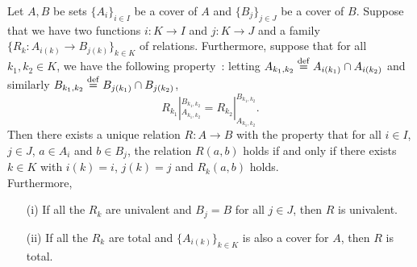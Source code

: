 \begin{proposition} \label{glueing-relations}
	Let $A,B$ be sets $\{A_i\}_{i \in I}$ be a cover of $A$ and $\{B_j\}_{j \in J}$ be a cover of $B$. Suppose that we have two functions $i : K \to I$ and $j : K \to J$ and a family $\{R_k : A_{i(k)} \to B_{j(k)}\}_{k \in K}$ of relations. Furthermore, suppose that for all $k_1,k_2 \in K$, we have the following property~: letting $A_{k_1,k_2} \overset{\mathrm{def}}{=} A_{i(k_1)} \cap A_{i(k_2)}$ and similarly $B_{k_1,k_2} \overset{\mathrm{def}}{=} B_{j(k_1)} \cap B_{j(k_2)}$, 
	\[
		R_{k_1}|_{A_{k_1,k_2}}^{B_{k_1,k_2}} = R_{k_2}|_{A_{k_1,k_2}}^{B_{k_1,k_2}}.
	\]
	Then there exists a unique relation $R : A \to B$ with the property that for all $i \in I$, $j \in J$, $a \in A_i$ and $b \in B_j$, the relation $R(a,b)$ holds if and only if there exists $k \in K$ with $i(k) = i$, $j(k) = j$ and $R_k(a,b)$ holds. 
	\\

	Furthermore,
	\begin{itemize}
		\item[(i)] If all the $R_k$ are univalent and $B_j = B$ for all $j \in J$, then $R$ is univalent.
		\item[(ii)] If all the $R_k$ are total and $\{A_{i(k)}\}_{k \in K}$ is also a cover for $A$, then $R$ is total.
	\end{itemize}
\end{proposition}

